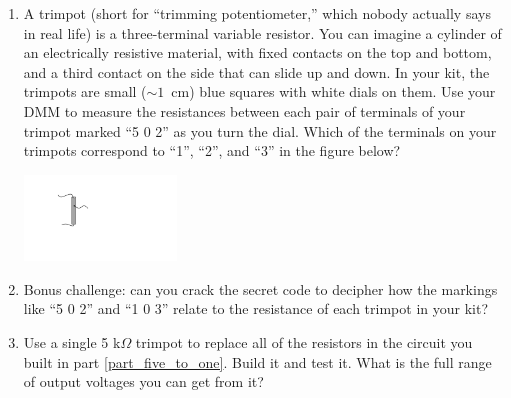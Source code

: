 \begin{enumerate}[wide]
\item A trimpot (short for ``trimming potentiometer,'' which nobody actually says in real life) is a three-terminal variable resistor.  You can imagine a cylinder of an electrically resistive material, with fixed contacts on the top and bottom, and a third contact on the side that can slide up and down.  In your kit, the trimpots are small ($\sim 1$~cm) blue squares with white dials on them.  Use your DMM to measure the resistances between each pair of terminals of your trimpot marked ``5 0 2'' as you turn the dial.  Which of the terminals on your trimpots correspond to ``1'', ``2'', and ``3'' in the figure below?   

\begin{center}
\includegraphics[height=0.9in]{voltage_dividers/trimpot_picture.pdf}
\hspace{0.7in}
\end{center}

\item Bonus challenge: can you crack the secret code to decipher how the markings like ``5 0 2'' and ``1 0 3'' relate to the resistance of each trimpot in your kit?  

\item Use a single 5 k$\Omega$ trimpot to replace all of the resistors in the circuit you built in part \ref{part_five_to_one}.  Build it and test it.  What is the full range of output voltages you can get from it?  


\end{enumerate}
